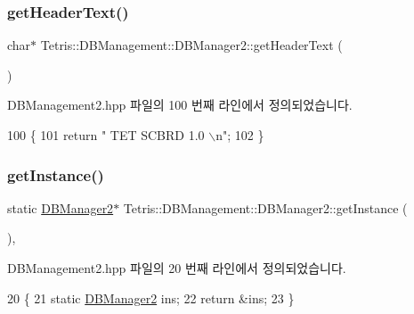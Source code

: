 \subsubsection{\texorpdfstring{get\+Header\+Text()}{getHeaderText()}}
{\footnotesize\ttfamily char$\ast$ Tetris\+::\+D\+B\+Management\+::\+D\+B\+Manager2\+::get\+Header\+Text (\begin{DoxyParamCaption}{ }\end{DoxyParamCaption})\hspace{0.3cm}{\ttfamily [inline]}}



D\+B\+Management2.\+hpp 파일의 100 번째 라인에서 정의되었습니다.


\begin{DoxyCode}
100                                  \{
101                 \textcolor{keywordflow}{return} \textcolor{stringliteral}{"  TET SCBRD 1.0  \(\backslash\)n"};
102             \}
\end{DoxyCode}
\mbox{\label{class_tetris_1_1_d_b_management_1_1_d_b_manager2_a5055491557a2202e0e84bb0688532a23}} 
\subsubsection{\texorpdfstring{get\+Instance()}{getInstance()}}
{\footnotesize\ttfamily static \hyperlink{class_tetris_1_1_d_b_management_1_1_d_b_manager2}{D\+B\+Manager2}$\ast$ Tetris\+::\+D\+B\+Management\+::\+D\+B\+Manager2\+::get\+Instance (\begin{DoxyParamCaption}{ }\end{DoxyParamCaption})\hspace{0.3cm}{\ttfamily [inline]}, {\ttfamily [static]}}



D\+B\+Management2.\+hpp 파일의 20 번째 라인에서 정의되었습니다.


\begin{DoxyCode}
20                                                 \{
21                     \textcolor{keyword}{static} \hyperlink{class_tetris_1_1_d_b_management_1_1_d_b_manager2_a4f78fec881471a80eb86b55696af208a}{DBManager2} ins;
22                     \textcolor{keywordflow}{return} &ins;
23                 \}
\end{DoxyCode}
\mbox{\label{class_tetris_1_1_d_b_management_1_1_d_b_manager2_a2d5133a870074bc297b8908856b9cd90}} 
